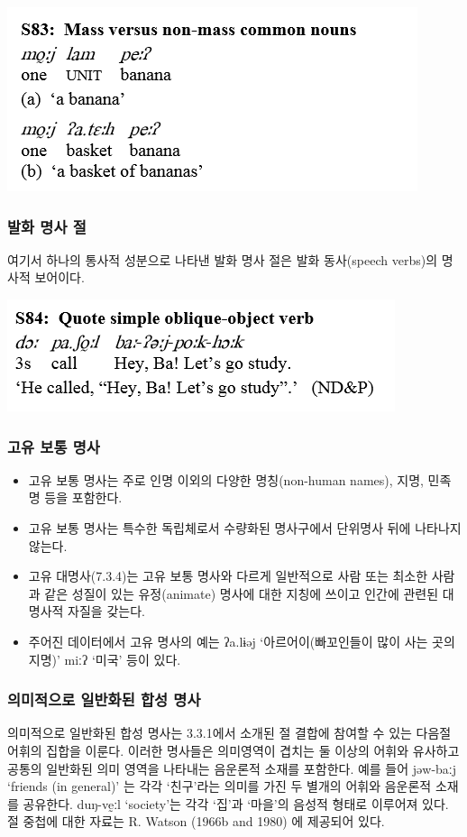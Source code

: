 \includegraphics{Pacoh/src/PacohS83.png}

\subsubsection{발화 명사 절}
여기서 하나의 통사적 성분으로 나타낸 발화 명사 절은 발화 동사(speech verbs)의 명사적 보어이다.

\includegraphics{Pacoh/src/PacohS84.png}

\subsubsection{고유 보통 명사}
\begin{itemize}
\item 고유 보통 명사는 주로 인명 이외의 다양한 명칭(non-human names), 지명, 민족명 등을 포함한다.
\item 고유 보통 명사는 특수한 독립체로서 수량화된 명사구에서 단위명사 뒤에 나타나지 않는다. 
\item 고유 대명사(7.3.4)는 고유 보통 명사와 다르게 일반적으로 사람 또는 최소한 사람과 같은 성질이 있는 유정(animate) 명사에 대한 지칭에 쓰이고 인간에 관련된 대명사적 자질을 갖는다.
\item 주어진 데이터에서 고유 명사의 예는 ʔa.lɨəj `아르어이(빠꼬인들이 많이 사는 곳의 지명)' miːʔ `미국' 등이 있다.
\end{itemize}

\subsubsection{의미적으로 일반화된 합성 명사}
의미적으로 일반화된 합성 명사는 3.3.1에서 소개된 절 결합에 참여할 수 있는 다음절 어휘의 집합을 이룬다.
이러한 명사들은 의미영역이 겹치는 둘 이상의 어휘와 유사하고 공통의 일반화된 의미 영역을 나타내는 음운론적 소재를 포함한다. 예를 들어 jəw-baːj `friends (in general)' 는 각각 `친구'라는 의미를 가진 두 별개의 어휘와 음운론적 소재를 공유한다. duŋ-vḛːl `society'는 각각 `집'과 `마을'의 음성적 형태로 이루어져 있다.
절 중첩에 대한 자료는 R. Watson (1966b and 1980) 에 제공되어 있다.

